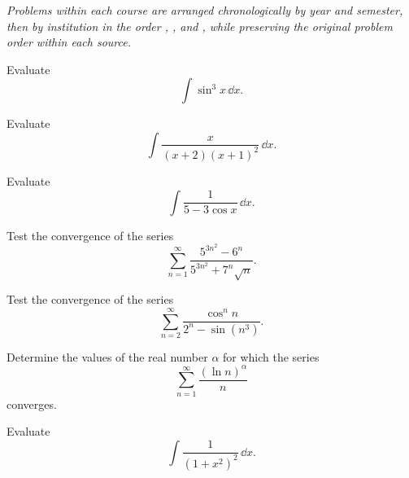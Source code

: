 \ifCASolutions\else
{\noindent\small\itshape Problems within each course are arranged chronologically by year and semester, then by institution in the order \POSTECH{}, \KAIST{}, and \SNU{}, while preserving the original problem order within each source.\par}
\vspace{0.22cm}
\fi

\begin{problem}
Evaluate
\[
\int \sin^3 x\,\dd x.
\]
\end{problem}

\begin{problem}
Evaluate
\[
\int \frac{x}{(x+2)(x+1)^2}\,\dd x.
\]
\end{problem}

\begin{problem}
Evaluate
\[
\int \frac{1}{5-3\cos x}\,\dd x.
\]
\end{problem}

\begin{problem}
Test the convergence of the series
\[
\sum_{n=1}^{\infty}
\frac{5^{3n^2}-6^n}{5^{3n^2}+7^n\sqrt n}.
\]
\end{problem}

\begin{problem}
Test the convergence of the series
\[
\sum_{n=2}^{\infty}
\frac{\cos^n n}{2^n-\sin(n^3)}.
\]
\end{problem}

\begin{problem}
Determine the values of the real number $\alpha$ for which the series
\[
\sum_{n=1}^{\infty}\frac{(\ln n)^\alpha}{n}
\]
converges.
\end{problem}

\begin{problem}
Evaluate
\[
\int \frac{1}{(1+x^2)^2}\,\dd x.
\]
\end{problem}

